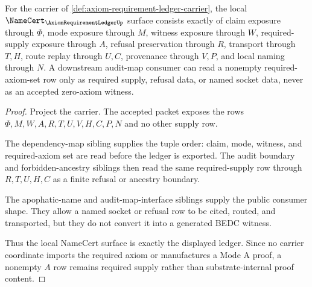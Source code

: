 \begin{theorem}
\label{thm:axiom-requirement-ledger-namecert-obligations}
For the carrier of \autoref{def:axiom-requirement-ledger-carrier}, the local $\NameCert_{\AxiomRequirementLedgerUp}$ surface consists exactly of claim exposure through $\Phi$, mode exposure through $M$, witness exposure through $W$, required-supply exposure through $A$, refusal preservation through $R$, transport through $T,H$, route replay through $U,C$, provenance through $V,P$, and local naming through $N$. A downstream audit-map consumer can read a nonempty required-axiom-set row only as required supply, refusal data, or named socket data, never as an accepted zero-axiom witness.
\end{theorem}
\begin{proof}
Project the carrier. The accepted packet exposes the rows $\Phi,M,W,A,R,T,U,V,H,C,P,N$ and no other supply row.

The dependency-map sibling supplies the tuple order: claim, mode, witness, and required-axiom set are read before the ledger is exported. The audit boundary and forbidden-ancestry siblings then read the same required-supply row through $R,T,U,H,C$ as a finite refusal or ancestry boundary.

The apophatic-name and audit-map-interface siblings supply the public consumer shape. They allow a named socket or refusal row to be cited, routed, and transported, but they do not convert it into a generated BEDC witness.

Thus the local NameCert surface is exactly the displayed ledger. Since no carrier coordinate imports the required axiom or manufactures a Mode A proof, a nonempty $A$ row remains required supply rather than substrate-internal proof content.
\end{proof}


